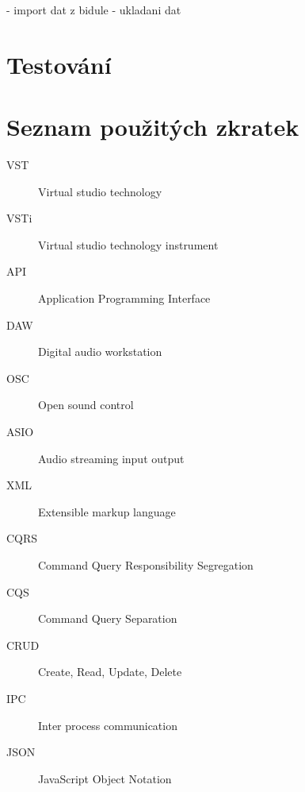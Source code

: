 \documentclass[thesis=M,czech]{FITthesis}[2019/03/06]
\begin{document}
		- import dat z bidule
		- ukladani dat


\chapter{Testování}

\begin{conclusion}
\end{conclusion}




\appendix

\chapter{Seznam použitých zkratek}
\begin{description}
	\item[VST] Virtual studio technology
	\item[VSTi] Virtual studio technology instrument
	\item[API] Application Programming Interface
	\item[DAW] Digital audio workstation
	\item[OSC] Open sound control
	\item[ASIO] Audio streaming input output
	\item[XML] Extensible markup language
	\item[CQRS] Command Query Responsibility Segregation
	\item[CQS] Command Query Separation
	\item[CRUD] Create, Read, Update, Delete
	\item[IPC] Inter process communication
	\item[JSON] JavaScript Object Notation
\end{description}
\end{document}
